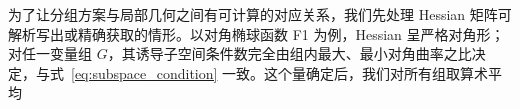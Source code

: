 为了让分组方案与局部几何之间有可计算的对应关系，我们先处理 Hessian 矩阵可解析写出或精确获取的情形。以对角椭球函数 F1 为例，Hessian 呈严格对角形；对任一变量组 $G$，其诱导子空间条件数完全由组内最大、最小对角曲率之比决定，与式~\eqref{eq:subspace_condition} 一致。这个量确定后，我们对所有组取算术平均